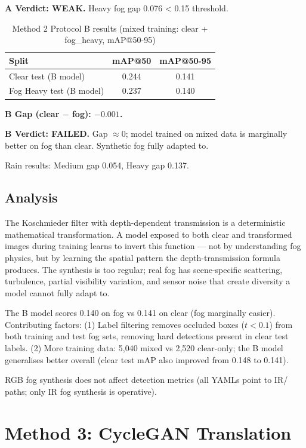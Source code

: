\documentclass[11pt,a4paper]{article}
\begin{document}
\textbf{A Verdict: WEAK.} Heavy fog gap 0.076 < 0.15 threshold.

\begin{table}[H]
\centering
\caption{Method 2 Protocol B results (mixed training: clear + fog\_heavy, mAP@50-95)}
\label{tab:method2_3b_results}
\begin{tabular}{lcc}
\toprule
Split & mAP@50 & mAP@50-95 \\
\midrule
Clear test (B model) & 0.244 & 0.141 \\
Fog Heavy test (B model) & 0.237 & 0.140 \\
\bottomrule
\end{tabular}
\end{table}

\textbf{B Gap (clear $-$ fog): $-0.001$.}

\textbf{B Verdict: FAILED.} Gap $\approx 0$; model trained on mixed data is marginally better on fog than clear. Synthetic fog fully adapted to.

Rain results: Medium gap 0.054, Heavy gap 0.137.

\subsection{Analysis}

The Koschmieder filter with depth-dependent transmission is a deterministic mathematical transformation. A model exposed to both clear and transformed images during training learns to invert this function --- not by understanding fog physics, but by learning the spatial pattern the depth-transmission formula produces. The synthesis is too regular; real fog has scene-specific scattering, turbulence, partial visibility variation, and sensor noise that create diversity a model cannot fully adapt to.

The B model scores 0.140 on fog vs 0.141 on clear (fog marginally easier). Contributing factors: (1) Label filtering removes occluded boxes ($t < 0.1$) from both training and test fog sets, removing hard detections present in clear test labels. (2) More training data: 5,040 mixed vs 2,520 clear-only; the B model generalises better overall (clear test mAP also improved from 0.148 to 0.141).

RGB fog synthesis does not affect detection metrics (all YAMLs point to IR/ paths; only IR fog synthesis is operative).

\section{Method 3: CycleGAN Translation}
\end{document}
